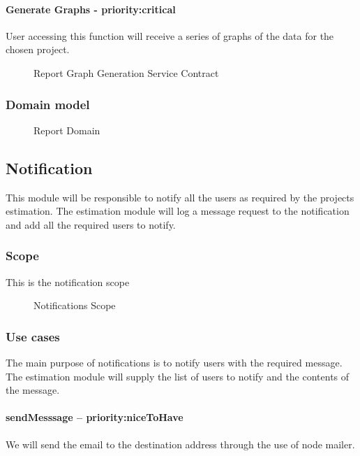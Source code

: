 	\paragraph{Generate Graphs - priority:critical}
	User accessing this function will receive a series of graphs of the data for the chosen project. 
	\begin{figure}[H]
	    	\centering
	    	\caption{Report Graph Generation Service Contract}
	    	\label{fig:Report_GraphGeneration.png Contract}
   	\end{figure}

\subsubsection{Domain model}
	\begin{figure}[H]
	    	\centering
	    	\caption{Report Domain}
	    	\label{fig:Report_Domain.png}
   	\end{figure}
\subsection{Notification}
This module will be responsible to notify all the users as required by the projects estimation. The estimation module will log a message request to the notification and add all the required users to notify.
\subsubsection{Scope}
This is the notification scope
	\begin{figure}[H]
	    	\centering
	    	\caption{Notifications Scope}
	    	\label{fig:Notification_Scope}
   	\end{figure}
\subsubsection{Use cases}
The main purpose of notifications is to notify users with the required message. The estimation module will supply the list of users to notify and the contents of the message.
\paragraph{sendMesssage -- priority:niceToHave}
We will send the email to the destination address through the use of node mailer. 
